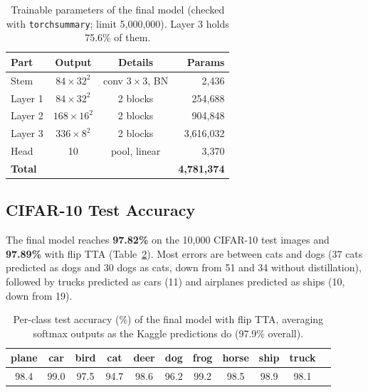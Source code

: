 \documentclass[letterpaper]{article}
\begin{document}
\begin{table}[t]
\centering
\small
\begin{tabular}{lccr}
\toprule
Part & Output & Details & Params \\
\midrule
Stem & $84\times32^2$ & conv $3\times3$, BN & 2,436 \\
Layer 1 & $84\times32^2$ & 2 blocks & 254,688 \\
Layer 2 & $168\times16^2$ & 2 blocks & 904,848 \\
Layer 3 & $336\times8^2$ & 2 blocks & 3,616,032 \\
Head & 10 & pool, linear & 3,370 \\
\midrule
\textbf{Total} & & & \textbf{4,781,374} \\
\bottomrule
\end{tabular}
\caption{Trainable parameters of the final model (checked with \texttt{torchsummary}; limit 5,000,000). Layer 3
holds 75.6\% of them.}
\label{tab:params}
\end{table}

\subsection{CIFAR-10 Test Accuracy}
The final model reaches \textbf{97.82\%} on the 10,000 CIFAR-10 test images and \textbf{97.89\%} with flip TTA
(Table~\ref{tab:class}). Most errors are between cats and dogs (37 cats predicted as dogs and 30 dogs as cats, down
from 51 and 34 without distillation), followed by trucks predicted as cars (11) and airplanes predicted as ships (10,
down from 19).

\begin{table}[t]
\centering
\small
\setlength{\tabcolsep}{3pt}
\begin{tabular}{ccccccccccc}
\toprule
plane & car & bird & cat & deer & dog & frog & horse & ship & truck \\
\midrule
98.4 & 99.0 & 97.5 & 94.7 & 98.6 & 96.2 & 99.2 & 98.5 & 98.9 & 98.1 \\
\bottomrule
\end{tabular}
\caption{Per-class test accuracy (\%) of the final model with flip TTA, averaging softmax outputs as the Kaggle predictions do (97.9\% overall).}
\label{tab:class}
\end{table}
\end{document}
